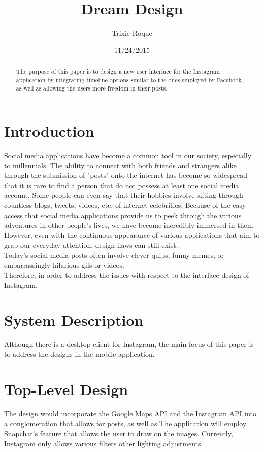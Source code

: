 \documentclass[11pt]{article}
\title{Dream Design}
\author{Trixie Roque}
\date{11/24/2015}
\begin{document}
\maketitle

\begin{abstract}
The purpose of this paper is to design a new user interface for the Instagram application by integrating timeline options similar to the ones employed by Facebook, as well as allowing the users more freedom in their posts.
\end{abstract}

\pagebreak
\tableofcontents

\pagebreak

\section{Introduction}
\label{Introduction}
    \indent Social media applications have become a common tool in our society, especially to millennials. The ability to connect with both friends and strangers alike through the submission of "posts" onto the internet has become so widespread that it is rare to find a person that do not possess at least one social media account. Some people can even say that their hobbies involve sifting through countless blogs, tweets, videos, etc. of internet celebrities. Because of the easy access that social media applications provide us to peek through the various adventures in other people's lives, we have become incredibly immersed in them. However, even with the continuous appearance of various applications that aim to grab our everyday attention, design flaws can still exist. \\
     \indent Today's social media posts often involve clever quips, funny memes, or embarrassingly hilarious gifs or videos. 
\\
    \indent Therefore, in order to address the issues with respect to the interface design of Instagram.


\section{System Description}
\label{System Description}
Although there is a desktop client for Instagram, the main focus of this paper is to address the designs in the mobile application. 

\section{Top-Level Design}
The design would incorporate the Google Maps API and the Instagram API into a conglomeration that allows for posts, as well as 
The application will employ Snapchat's feature that allows the user to draw on the images. Currently, Instagram only allows various filters other lighting adjustments
\end{document}
